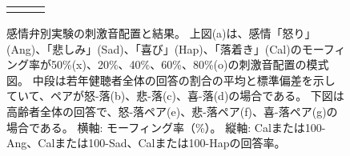 \begin{figure}[t]
\begin{tabular}{ccc}
  \begin{minipage} {0.31\hsize}
  \centering
  \includegraphics [ width = 1\columnwidth]{Figure/ExpCalm/FigEld_Raw_AllSbj_cal-sad.eps }
  \end{minipage} &
  
  \begin{minipage} {0.31\hsize}
  \centering
  \includegraphics [ width = 1\columnwidth]{Figure/ExpCalm/FigEld_Raw_AllSbj_cal-hap.eps }
  \end{minipage}
  
  \end{tabular}
  
  \vspace {-6pt}
  \caption{感情弁別実験の刺激音配置と結果。
            上図(a)は、感情「怒り」(Ang)、「悲しみ」(Sad)、「喜び」(Hap)、「落着き」(Cal)のモーフィング率が50\%(x)、20\%、40\%、60\%、80\%(o)の刺激音配置の模式図。
            中段は若年健聴者全体の回答の割合の平均と標準偏差を示していて、ペアが怒-落(b)、悲-落(c)、喜-落(d)の場合である。
            下図は高齢者全体の回答で、怒-落ペア(e)、悲-落ペア(f)、喜-落ペア(g)の場合である。
            横軸: モーフィング率（\%）。 縦軸: Calまたは100-Ang、Calまたは100-Sad、Calまたは100-Hapの回答率。}
  
  \label{fig:ExpRsltEmoPercent_Calm}

  \vspace {-12pt}
  \end{figure}


